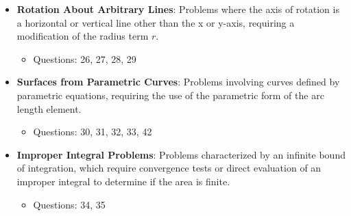 \documentclass[12pt]{article}
\begin{document}
\begin{itemize}
    \item \textbf{Rotation About Arbitrary Lines}: Problems where the axis of rotation is a horizontal or vertical line other than the x or y-axis, requiring a modification of the radius term $r$.
    \begin{itemize}
        \item Questions: 26, 27, 28, 29
    \end{itemize}

    \item \textbf{Surfaces from Parametric Curves}: Problems involving curves defined by parametric equations, requiring the use of the parametric form of the arc length element.
    \begin{itemize}
        \item Questions: 30, 31, 32, 33, 42
    \end{itemize}

    \item \textbf{Improper Integral Problems}: Problems characterized by an infinite bound of integration, which require convergence tests or direct evaluation of an improper integral to determine if the area is finite.
    \begin{itemize}
        \item Questions: 34, 35
    \end{itemize}
\end{itemize}
\end{document}
